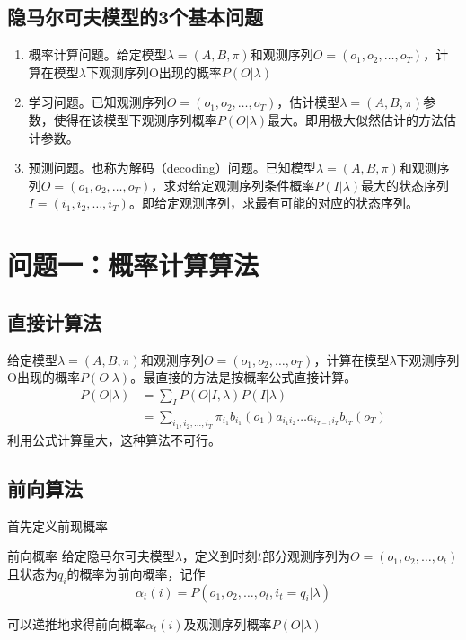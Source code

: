 \subsection*{隐马尔可夫模型的3个基本问题}
\begin{enumerate}
	\item 概率计算问题。给定模型$\lambda=(A,B,\pi)$和观测序列$O=(o_1,o_2,\dots,o_T)$，计算在模型$\lambda$下观测序列O出现的概率$P(O|\lambda)$
	\item 学习问题。已知观测序列$O=(o_1,o_2,\dots,o_T)$，估计模型$\lambda=(A,B,\pi)$参数，使得在该模型下观测序列概率$P(O|\lambda)$最大。即用极大似然估计的方法估计参数。
	\item 预测问题。也称为解码（decoding）问题。已知模型$\lambda=(A,B,\pi)$和观测序列$O=(o_1,o_2,\dots,o_T)$，求对给定观测序列条件概率$P(I|\lambda)$最大的状态序列$I=(i_1,i_2,\dots,i_T)$。即给定观测序列，求最有可能的对应的状态序列。
\end{enumerate} 

\section*{问题一：概率计算算法}
\subsection*{直接计算法}
给定模型$\lambda=(A,B,\pi)$和观测序列$O=(o_1,o_2,\dots,o_T)$，计算在模型$\lambda$下观测序列O出现的概率$P(O|\lambda)$。最直接的方法是按概率公式直接计算。
\begin{equation}
\begin{aligned}
	P(O|\lambda)&=\sum_{I}P(O|I,\lambda)P(I|\lambda)\\
	&=\sum_{i_1,i_2,\dots,i_T}\pi_{i_1}b_{i_1}(o_{1})a_{i_1i_2}\dots a_{i_{T-1}i_T}b_{i_T}(o_T)
\end{aligned}
\end{equation}
利用公式计算量大，这种算法不可行。
\subsection*{前向算法}
首先定义前现概率
\begin{definition}{前向概率}{}
	给定隐马尔可夫模型$\lambda$，定义到时刻$t$部分观测序列为$O=(o_1,o_2,\dots,o_t)$且状态为$q_i$的概率为前向概率，记作
	\begin{equation}
		\alpha_t(i)=P(o_1,o_2,\dots,o_t,i_t=q_i|\lambda)
	\end{equation}
\end{definition}
可以递推地求得前向概率$\alpha_t(i)$及观测序列概率$P(O|\lambda)$

